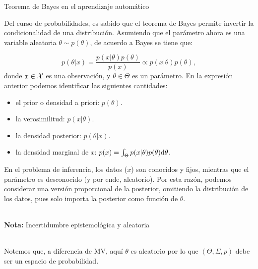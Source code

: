 \documentclass[9pt, handout]{beamer}
\begin{document}
\begin{frame}{Teorema de Bayes en el aprendizaje automático}

Del curso de probabilidades, es sabido que el teorema de Bayes permite invertir la condicionalidad de una distribución. Asumiendo que el parámetro  ahora es una variable aleatoria $\theta\sim p(\theta)$, de acuerdo a Bayes se tiene que:

\begin{equation*}
	p(\theta|x) = \frac{p(x|\theta)p(\theta)}{p(x)} \propto p(x|\theta)p(\theta),\label{eq:Bayes}
\end{equation*}
donde $x\in{\mathcal X}$ es una observación, y $\theta\in\Theta$ es un parámetro. \pause En la expresión anterior podemos identificar las siguientes cantidades:
\begin{itemize}
	\item el prior o densidad a priori: $p(\theta)$. \pause
	\item la verosimilitud: $p(x|\theta)$. \pause
	\item la densidad posterior: $p(\theta|x)$. \pause
	\item la densidad marginal de $x$: $p(x) = \int_\Theta p(x|\theta)p(\theta){\text d}\theta$. \pause
\end{itemize} 

En el problema de inferencia, los datos ($x$) son conocidos y fijos, mientras que el parámetro es desconocido (y por ende, aleatorio). Por esta razón, podemos considerar una versión proporcional de la posterior, omitiendo la distribución de los datos, pues solo importa la posterior como función de $\theta$.\\~\ \pause

\textbf{Nota:} Incertidumbre epistemológica y aleatoria\\~\

Notemos que, a diferencia de MV, aquí $\theta$ es aleatorio por lo que $(\Theta,  \Sigma, p)$ debe ser un espacio de probabilidad.
\end{frame}
\end{document}
